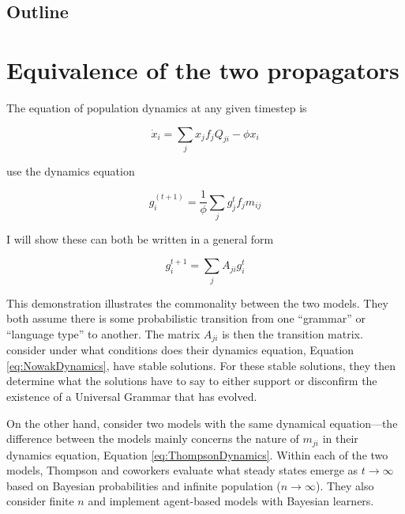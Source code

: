 \documentclass[11pt,letterpaper]{article}
\begin{document}
\subsection{Outline}
\label{sub:Outline}





\section{Equivalence of the two propagators}
\label{sec:PropagatorEquivalence}

The  equation of population dynamics at any given timestep
is

\begin{equation}
  \dot{x}_i = \sum_{j} x_j f_j Q_{ji} - \phi x_i
  \label{eq:NowakDynamics}
\end{equation}

\noindent
{} use the dynamics equation

\begin{equation}
  g^{(t+1)}_i = \frac{1}{\phi} \sum_{j} g_j^t f_j m_{ij}
  \label{eq:ThompsonDynamics}
\end{equation}

\noindent
I will show these can both be written in a general form 

\begin{equation}
  g_i^{t+1} = \sum_j A_{ji} g_i^t
\end{equation}

This demonstration illustrates the commonality between the two models. They
both assume there is some probabilistic transition 
from one ``grammar'' or ``language type'' to another. The matrix $A_{ji}$ is
then the transition matrix.  consider under what conditions
does their dynamics equation, Equation \ref{eq:NowakDynamics}, have stable
solutions. For these stable solutions, they then determine what the solutions
have to say to either support or disconfirm the existence of a Universal Grammar 
that has evolved.

On the other hand,  consider two models with the same
dynamical equation---the difference between the models mainly concerns the
nature of $m_{ji}$ in their dynamics equation, Equation 
\ref{eq:ThompsonDynamics}. Within each of the two models, Thompson and coworkers
evaluate what steady states emerge as $t \rightarrow \infty$ based on
Bayesian probabilities and infinite population ($n \rightarrow \infty$). 
They also consider finite $n$ and implement agent-based models with Bayesian
learners.
\end{document}
